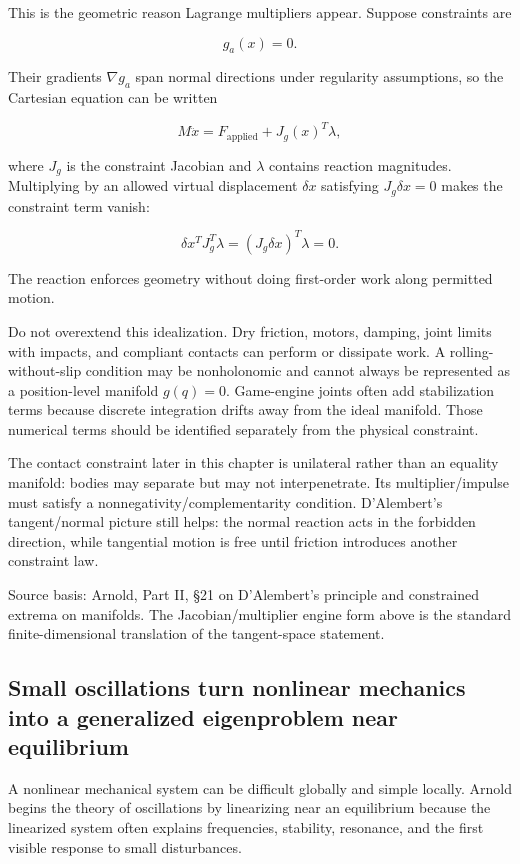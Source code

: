 This is the geometric reason Lagrange multipliers appear. Suppose constraints are

\[
g_a(x)=0.
\]

Their gradients \(\nabla g_a\) span normal directions under regularity assumptions, so the Cartesian equation can be written

\[
M\ddot x
=
F_{\mathrm{applied}}
+
J_g(x)^T\lambda,
\]

where \(J_g\) is the constraint Jacobian and \(\lambda\) contains reaction magnitudes. Multiplying by an allowed virtual displacement \(\delta x\) satisfying \(J_g\delta x=0\) makes the constraint term vanish:

\[
\delta x^T J_g^T\lambda
=
(J_g\delta x)^T\lambda
=
0.
\]

The reaction enforces geometry without doing first-order work along permitted motion.

Do not overextend this idealization. Dry friction, motors, damping, joint limits with impacts, and compliant contacts can perform or dissipate work. A rolling-without-slip condition may be nonholonomic and cannot always be represented as a position-level manifold \(g(q)=0\). Game-engine joints often add stabilization terms because discrete integration drifts away from the ideal manifold. Those numerical terms should be identified separately from the physical constraint.

The contact constraint later in this chapter is unilateral rather than an equality manifold: bodies may separate but may not interpenetrate. Its multiplier/impulse must satisfy a nonnegativity/complementarity condition. D'Alembert's tangent/normal picture still helps: the normal reaction acts in the forbidden direction, while tangential motion is free until friction introduces another constraint law.

Source basis: Arnold, Part II, §21 on D'Alembert's principle and constrained extrema on manifolds. The Jacobian/multiplier engine form above is the standard finite-dimensional translation of the tangent-space statement.

\subsection{Small oscillations turn nonlinear mechanics into a generalized eigenproblem near equilibrium}\label{06-engine-ii-ch033-small-oscillations-turn-nonlinear-mechanics-into-a-generalized-eigenproblem-near-equilibrium}

A nonlinear mechanical system can be difficult globally and simple locally. Arnold begins the theory of oscillations by linearizing near an equilibrium because the linearized system often explains frequencies, stability, resonance, and the first visible response to small disturbances.

